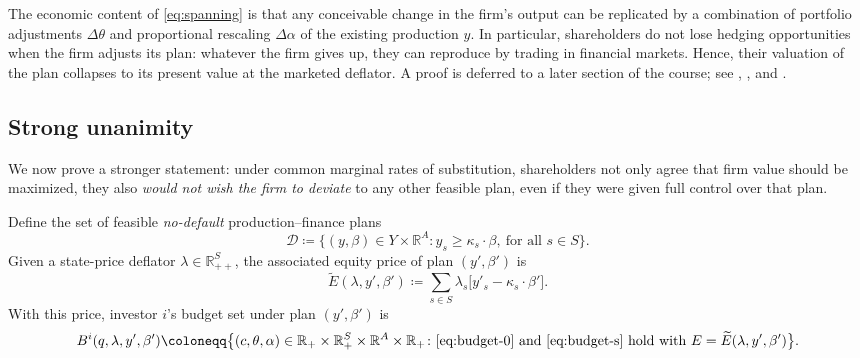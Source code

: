 \documentclass[11pt,a4paper,oneside]{book}
\def\R{\mathbb{R}}
\def\geq{\geqslant}
\theoremstyle{plain}
\theoremstyle{definition}
\theoremstyle{remark}
\numberwithin{equation}{chapter}
\begin{document}
The economic content of \eqref{eq:spanning} is that any conceivable change in the firm's output can be replicated by a combination of portfolio adjustments $\Delta \theta$ and proportional rescaling $\Delta \alpha$ of the existing production $y$.
In particular, shareholders do not lose hedging opportunities when the firm adjusts its plan: whatever the firm gives up, they can reproduce by trading in financial markets.
Hence, their valuation of the plan collapses to its present value at the marketed deflator.
A proof is deferred to a later section of the course; see \citet{EkernWilson1974}, \citet{Leland1974}, and \citet{MagillQuinzii2009}.

\subsection{Strong unanimity}

We now prove a stronger statement: under common marginal rates of substitution, shareholders not only agree that firm value should be maximized, they also \emph{would not wish the firm to deviate} to any other feasible plan, even if they were given full control over that plan.

Define the set of feasible \emph{no-default} production--finance plans
\begin{equation}\label{eq:feasible-set}
  \mathcal{D} \coloneqq \bigl\{ (y, \beta) \in Y \times \R^A \colon y_s \geq \kappa_s \cdot \beta, \ \text{for all $s\in S$} \bigr\}.
\end{equation}
Given a state-price deflator $\lambda \in \R^S_{++}$, the associated equity price of plan $(y', \beta')$ is
\begin{equation}\label{eq:tilde-E}
  \widetilde{E}(\lambda, y', \beta') \coloneqq \sum_{s \in S} \lambda_s \bigl[ y'_s - \kappa_s \cdot \beta' \bigr].
\end{equation}
With this price, investor $i$'s budget set under plan $(y', \beta')$ is
\begin{equation*}
  B^i(q, \lambda, y', \beta')
  \coloneqq
  \bigl\{ (c, \theta, \alpha) \in \R_+ \times \R_+^S \times \R^A \times \R_+ \colon \text{\eqref{eq:budget-0} and \eqref{eq:budget-s} hold with } E = \widetilde{E}(\lambda, y', \beta') \bigr\}.
\end{equation*}
\end{document}
